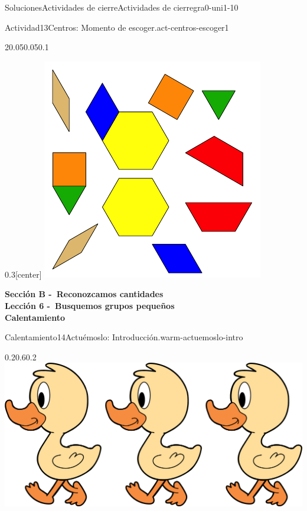 \documentclass[twoside,10pt,]{article}
\begin{document}
\begin{solutions-section}{Soluciones}{Actividades de cierre}{}{Actividades de cierre}{}{}{gra0-uni1-10}
\begin{activitysolution}{Actividad}{13}{Centros: Momento de escoger.}{act-centros-escoger1}
\begin{sidebyside}{2}{0.05}{0.05}{0.1}
\begin{sbspanel}{0.3}[center]
\includegraphics[width=\linewidth]{external/svg-source/tikz-file-147344.pdf}
\end{sbspanel}%
\end{sidebyside}%
\end{activitysolution}%
\par\medskip
\noindent\textbf{\large{}\space\textperiodcentered\space{}Sección B -~Reconozcamos cantidades\\
\space\textperiodcentered\space{}Lección 6 -~Busquemos grupos pequeños\\
\space\textperiodcentered\space{}Calentamiento}
\begin{explorationsolution}{Calentamiento}{14}{Actuémoslo: Introducción.}{warm-actuemoslo-intro}%
\begin{image}{0.2}{0.6}{0.2}{}%
\includegraphics[width=\linewidth]{external/png-source/3 ducks.png}

\end{image}
\end{explorationsolution}
\end{solutions-section}
\end{document}
